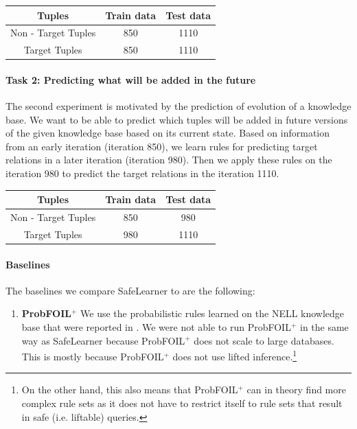 \documentclass[akbc,twoside,11pt]{article}
\newcommand{\algorithmname}{SafeLearner\xspace}
\begin{document}
\begin{center}
\begin{tabular}{|c|c|c|}
\hline
Tuples                	&Train data     &Test data\\
\hline
Non - Target Tuples     & 850           & 1110\\
Target Tuples           & 850           & 1110\\
\hline
\end{tabular}
\end{center}
\vspace{0.2cm}

\paragraph{Task 2: Predicting what will be added in the future}
The second experiment is motivated by the prediction of evolution of a knowledge base. We want to be able to predict which tuples will be added in future versions of the given knowledge base based on its current state. 
Based on information from an early iteration (iteration 850), we learn rules for predicting target relations in a later iteration (iteration 980). Then we apply these rules on the iteration 980 to predict the target relations in the iteration 1110.

\begin{center}
\begin{tabular}{|c|c|c|}
\hline
Tuples                	&Train data     &Test data\\
\hline
Non - Target Tuples     & 850           & 980\\
Target Tuples           & 980           & 1110\\
\hline
\end{tabular}
\end{center}
\vspace{0.2cm}
\fi %


\paragraph{Baselines} The baselines we compare \algorithmname to are the following:

\begin{enumerate}
    \item {\bf ProbFOIL$^+$} We use the probabilistic rules learned on the NELL knowledge base that were reported in \cite{DBLP:conf/ijcai/RaedtDTBV15}. We were not able to run ProbFOIL$^+$ in the same way as \algorithmname because ProbFOIL$^+$ does not scale to large databases. This is mostly because ProbFOIL$^+$ does not use lifted inference.\footnote{On the other hand, this also means that ProbFOIL$^+$ can in theory find more complex rule sets as it does not have to restrict itself to rule sets that result in safe (i.e. liftable) queries.}
\end{enumerate}
\end{document}
